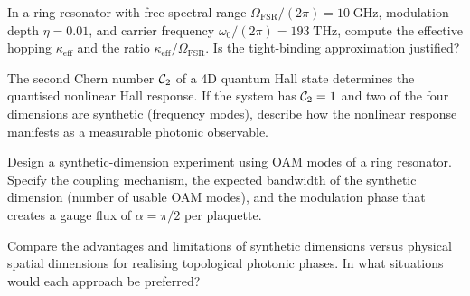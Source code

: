 \begin{exercise}
  In a ring resonator with free spectral range
  $\Omega_{\mathrm{FSR}}/(2\pi)=10\;\mathrm{GHz}$, modulation depth
  $\eta=0.01$, and carrier frequency $\omega_0/(2\pi)=193\;\mathrm{THz}$,
  compute the effective hopping $\kappa_{\mathrm{eff}}$ and the ratio
  $\kappa_{\mathrm{eff}}/\Omega_{\mathrm{FSR}}$.  Is the tight-binding
  approximation justified?
\end{exercise}

\begin{exercise}
  The second Chern number $\mathcal{C}_2$ of a 4D quantum Hall state
  determines the quantised nonlinear Hall response.  If the system has
  $\mathcal{C}_2=1$ and two of the four dimensions are synthetic (frequency
  modes), describe how the nonlinear response manifests as a measurable
  photonic observable.
\end{exercise}

\begin{exercise}
  Design a synthetic-dimension experiment using OAM modes of a ring
  resonator.  Specify the coupling mechanism, the expected bandwidth
  of the synthetic dimension (number of usable OAM modes), and the
  modulation phase that creates a gauge flux of $\alpha=\pi/2$ per
  plaquette.
\end{exercise}

\begin{exercise}
  Compare the advantages and limitations of synthetic dimensions versus
  physical spatial dimensions for realising topological photonic phases.
  In what situations would each approach be preferred?
\end{exercise}
